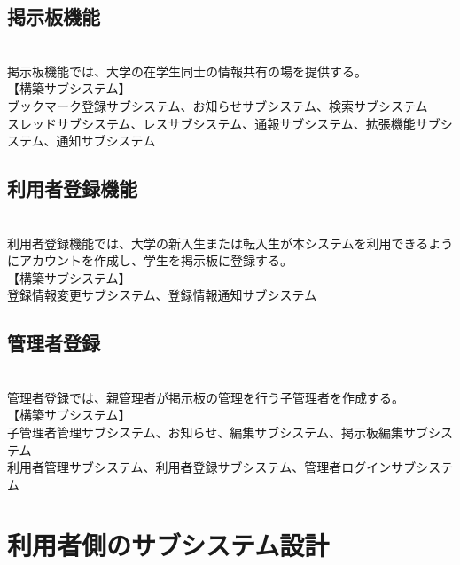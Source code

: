 \documentclass[a4j]{jarticle}
\begin{document}
\subsection{掲示板機能}
\\掲示板機能では、大学の在学生同士の情報共有の場を提供する。
\\【構築サブシステム】
\\ ブックマーク登録サブシステム、お知らせサブシステム、検索サブシステム
\\ スレッドサブシステム、レスサブシステム、通報サブシステム、拡張機能サブシステム、通知サブシステム

\subsection{利用者登録機能}
\\利用者登録機能では、大学の新入生または転入生が本システムを利用できるようにアカウントを作成し、学生を掲示板に登録する。
\\【構築サブシステム】
\\ 登録情報変更サブシステム、登録情報通知サブシステム

\subsection{管理者登録}
\\管理者登録では、親管理者が掲示板の管理を行う子管理者を作成する。
\\【構築サブシステム】
\\ 子管理者管理サブシステム、お知らせ、編集サブシステム、掲示板編集サブシステム
\\ 利用者管理サブシステム、利用者登録サブシステム、管理者ログインサブシステム

\section{利用者側のサブシステム設計}
\end{document}
